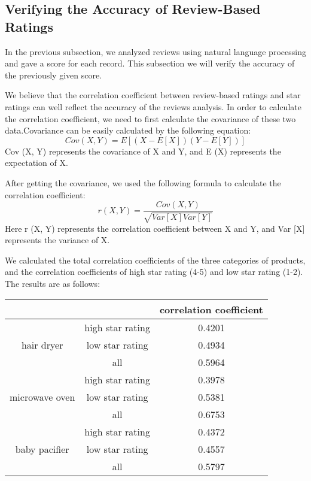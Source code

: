 \documentclass{mcmthesis}
\begin{document}
\subsection{Verifying the Accuracy of Review-Based Ratings}
In the previous subsection, we analyzed reviews using natural language processing and gave a score for each record. This subsection we will verify the accuracy of the previously given score.

We believe that the correlation coefficient between review-based ratings and star ratings can well reflect the accuracy of the reviews analysis. In order to calculate the correlation coefficient, we need to first calculate the covariance of these two data.Covariance can be easily calculated by the following equation:
$$Cov(X,Y)=E[(X-E[X])(Y-E[Y])]$$
Cov (X, Y) represents the covariance of X and Y, and E (X) represents the expectation of X.

After getting the covariance, we used the following formula to calculate the correlation coefficient:
$$r(X,Y)=\frac{Cov(X,Y)}{\sqrt{Var[X]Var[Y]}}$$
Here r (X, Y) represents the correlation coefficient between X and Y, and Var [X] represents the variance of X.

We calculated the total correlation coefficients of the three categories of products, and the correlation coefficients of high star rating (4-5) and low star rating (1-2). The results are as follows:



\begin{table}[]
	\begin{center} 
		\begin{tabular}{|c|c|c|}
			\hline
			&                  & correlation coefficient \\ \hline
			\multirow{3}{*}{hair dryer}     & high star rating & 0.4201                  \\ \cline{2-3} 
			& low star rating  & 0.4934                  \\ \cline{2-3} 
			& all              & 0.5964                  \\ \hline
			\multirow{3}{*}{microwave oven} & high star rating & 0.3978                  \\ \cline{2-3} 
			& low star rating  & 0.5381                  \\ \cline{2-3} 
			& all              & 0.6753                  \\ \hline
			\multirow{3}{*}{baby pacifier}  & high star rating & 0.4372                  \\ \cline{2-3} 
			& low star rating  & 0.4557                  \\ \cline{2-3} 
			& all              & 0.5797                  \\ \hline
		\end{tabular}
	\end{center}
\end{table}
\end{document}
